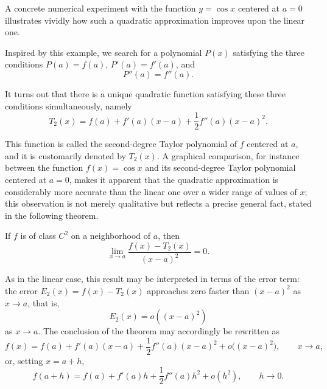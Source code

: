 A concrete numerical experiment with the function $y = \cos x$ centered at $a = 0$ illustrates vividly how such a quadratic approximation improves upon the linear one.

Inspired by this example, we search for a polynomial $P(x)$ satisfying the three conditions $P(a) = f(a)$, $P'(a) = f'(a)$, and
\[
P''(a) = f''(a).
\]

It turns out that there is a unique quadratic function satisfying these three conditions simultaneously, namely
\[
T_2(x) = f(a) + f'(a)(x-a) + \frac{1}{2} f''(a) (x-a)^2.
\]

This function is called the second-degree Taylor polynomial of $f$ centered at $a$, and it is customarily denoted by $T_2(x)$. A graphical comparison, for instance between the function $f(x) = \cos x$ and its second-degree Taylor polynomial centered at $a = 0$, makes it apparent that the quadratic approximation is considerably more accurate than the linear one over a wider range of values of $x$; this observation is not merely qualitative but reflects a precise general fact, stated in the following theorem.

\begin{theorem}
If $f$ is of class $C^2$ on a neighborhood of $a$, then
\[
\lim_{x \to a} \frac{f(x) - T_2(x)}{(x-a)^2} = 0.
\]

\end{theorem}

As in the linear case, this result may be interpreted in terms of the error term: the error $E_2(x) = f(x) - T_2(x)$ approaches zero faster than $(x-a)^2$ as $x \to a$, that is,
\[
E_2(x) = o((x-a)^2)
\]
 as $x \to a$. The conclusion of the theorem may accordingly be rewritten as
\[
f(x) = f(a) + f'(a)(x-a) + \frac{1}{2} f''(a)(x-a)^2 + o\big((x-a)^2\big), \qquad x \to a,
\] or, setting $x = a+h$,
\[
f(a+h) = f(a) + f'(a) h + \frac{1}{2} f''(a) h^2 + o(h^2), \qquad h \to 0.
\]

